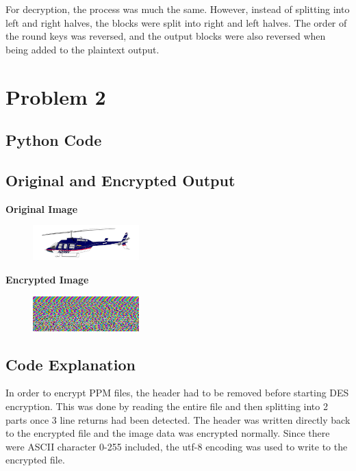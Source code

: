 \documentclass[11pt]{article}
\begin{document}
For decryption, the process was much the same. However, instead of splitting into left and right halves, the blocks were split into right and left halves. The order of the round keys was reversed, and the output blocks were also reversed when being added to the plaintext output.

\pagebreak

\section{Problem 2}
\subsection{Python Code}

\pagebreak

\subsection{Original and Encrypted Output}
\textbf{Original Image}
\begin{figure}[h!]
	\includegraphics[scale=2]{OriginalImage.png}
\end{figure}

\textbf{Encrypted Image}
\begin{figure}[h!]
	\includegraphics[scale=2]{EncryptedImage.png}
\end{figure}
\pagebreak

\subsection{Code Explanation}
In order to encrypt PPM files, the header had to be removed before starting DES encryption. This was done by reading the entire file and then splitting into 2 parts once 3 line returns had been detected. The header was written directly back to the encrypted file and the image data was encrypted normally. Since there were ASCII character 0-255 included, the utf-8 encoding was used to write to the encrypted file.
\end{document}
